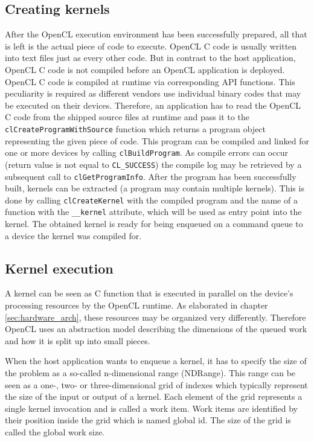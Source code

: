 \subsection{Creating kernels}
After the OpenCL execution environment has been successfully prepared, all that is left is the actual piece of code to execute. OpenCL C code is usually written into text files just as every other code. But in contrast to the host application, OpenCL C code is not compiled before an OpenCL application is deployed. OpenCL C code is compiled at runtime via corresponding API functions. This peculiarity is required as different vendors use individual binary codes that may be executed on their devices.
Therefore, an application has to read the OpenCL C code from the shipped source files at runtime and pass it to the \lstinline!clCreateProgramWithSource! function which returns a program object representing the given piece of code. This program can be compiled and linked for one or more devices by calling \lstinline!clBuildProgram!. As compile errors can occur (return value is not equal to \lstinline!CL_SUCCESS!) the compile log may be retrieved by a subsequent call to \lstinline!clGetProgramInfo!. After the program has been successfully built, kernels can be extracted (a program may contain multiple kernels). This is done by calling \lstinline!clCreateKernel! with the compiled program and the name of a function with the \lstinline!__kernel! attribute, which will be used as entry point into the kernel. The obtained kernel is ready for being enqueued on a command queue to a device the kernel was compiled for. \cite[p.26, 27]{opencl_book}

\subsection{Kernel execution}
\label{sec:kernel_execcution}
A kernel can be seen as C function that is executed in parallel on the device's processing resources by the OpenCL runtime. As elaborated in chapter \ref{sec:hardware_arch}, these resources may be organized very differently. Therefore OpenCL uses an abstraction model describing the dimensions of the queued work and how it is split up into small pieces. \cite[p.16]{opencl_book}

When the host application wants to enqueue a kernel, it has to specify the size of the problem as a so-called n-dimensional range (NDRange). This range can be seen as a one-, two- or three-dimensional grid of indexes which typically represent the size of the input or output of a kernel. Each element of the grid represents a single kernel invocation and is called a work item. Work items are identified by their position inside the grid which is named global id. The size of the grid is called the global work size. \cite[p.18]{opencl_book}

